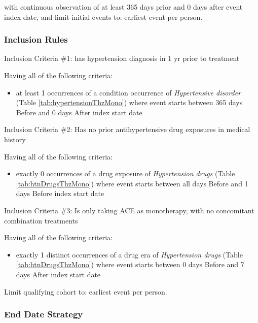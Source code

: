 \documentclass[11pt]{book}
\providecommand{\tightlist}{%
  \setlength{\itemsep}{0pt}\setlength{\parskip}{0pt}}
\theoremstyle{definition}
\theoremstyle{definition}
\theoremstyle{definition}
\theoremstyle{remark}
\begin{document}
with continuous observation of at least 365 days prior and 0 days after event index date, and limit initial events to: earliest event per person.

\hypertarget{inclusion-rules-1}{%
\subsubsection*{Inclusion Rules}\label{inclusion-rules-1}}

Inclusion Criteria \#1: has hypertension diagnosis in 1 yr prior to treatment

Having all of the following criteria:

\begin{itemize}
\tightlist
\item
  at least 1 occurrences of a condition occurrence of \emph{Hypertensive disorder} (Table \ref{tab:hypertensionThzMono}) where event starts between 365 days Before and 0 days After index start date
\end{itemize}

Inclusion Criteria \#2: Has no prior antihypertensive drug exposures in medical history

Having all of the following criteria:

\begin{itemize}
\tightlist
\item
  exactly 0 occurrences of a drug exposure of \emph{Hypertension drugs} (Table \ref{tab:htnDrugsThzMono}) where event starts between all days Before and 1 days Before index start date
\end{itemize}

Inclusion Criteria \#3: Is only taking ACE as monotherapy, with no concomitant combination treatments

Having all of the following criteria:

\begin{itemize}
\tightlist
\item
  exactly 1 distinct occurrences of a drug era of \emph{Hypertension drugs} (Table \ref{tab:htnDrugsThzMono}) where event starts between 0 days Before and 7 days After index start date
\end{itemize}

Limit qualifying cohort to: earliest event per person.

\hypertarget{end-date-strategy-4}{%
\subsubsection*{End Date Strategy}\label{end-date-strategy-4}}
\end{document}
